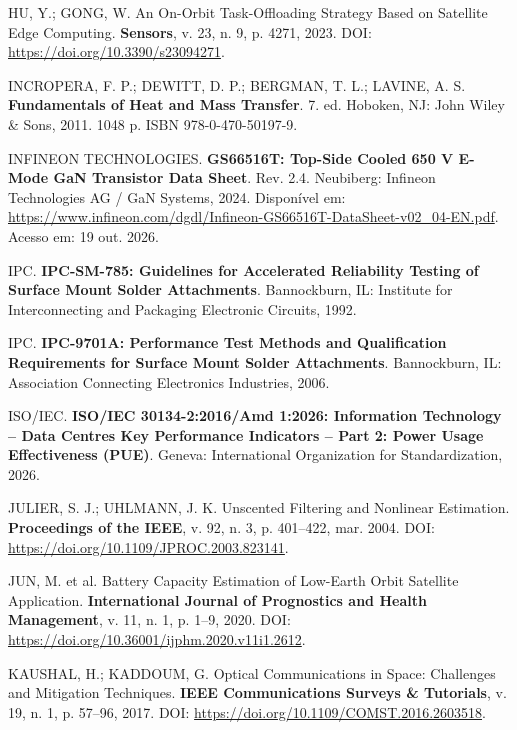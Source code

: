 \vspace{0.2cm}
\noindent HU, Y.; GONG, W. An On-Orbit Task-Offloading Strategy Based on Satellite Edge Computing. \textbf{Sensors}, v. 23, n. 9, p. 4271, 2023. DOI: \url{https://doi.org/10.3390/s23094271}.

\vspace{0.2cm}
\noindent INCROPERA, F. P.; DEWITT, D. P.; BERGMAN, T. L.; LAVINE, A. S. \textbf{Fundamentals of Heat and Mass Transfer}. 7. ed. Hoboken, NJ: John Wiley \& Sons, 2011. 1048 p. ISBN 978-0-470-50197-9.

\vspace{0.2cm}
\noindent INFINEON TECHNOLOGIES. \textbf{GS66516T: Top-Side Cooled 650 V E-Mode GaN Transistor Data Sheet}. Rev. 2.4. Neubiberg: Infineon Technologies AG / GaN Systems, 2024. Disponível em: \url{https://www.infineon.com/dgdl/Infineon-GS66516T-DataSheet-v02_04-EN.pdf}. Acesso em: 19 out. 2026.

\vspace{0.2cm}
\noindent IPC. \textbf{IPC-SM-785: Guidelines for Accelerated Reliability Testing of Surface Mount Solder Attachments}. Bannockburn, IL: Institute for Interconnecting and Packaging Electronic Circuits, 1992.

\vspace{0.2cm}
\noindent IPC. \textbf{IPC-9701A: Performance Test Methods and Qualification Requirements for Surface Mount Solder Attachments}. Bannockburn, IL: Association Connecting Electronics Industries, 2006.

\vspace{0.2cm}
\noindent ISO/IEC. \textbf{ISO/IEC 30134-2:2016/Amd 1:2026: Information Technology -- Data Centres Key Performance Indicators -- Part 2: Power Usage Effectiveness (PUE)}. Geneva: International Organization for Standardization, 2026.

\vspace{0.2cm}
\noindent JULIER, S. J.; UHLMANN, J. K. Unscented Filtering and Nonlinear Estimation. \textbf{Proceedings of the IEEE}, v. 92, n. 3, p. 401--422, mar. 2004. DOI: \url{https://doi.org/10.1109/JPROC.2003.823141}.

\vspace{0.2cm}
\noindent JUN, M. et al. Battery Capacity Estimation of Low-Earth Orbit Satellite Application. \textbf{International Journal of Prognostics and Health Management}, v. 11, n. 1, p. 1--9, 2020. DOI: \url{https://doi.org/10.36001/ijphm.2020.v11i1.2612}.

\vspace{0.2cm}
\noindent KAUSHAL, H.; KADDOUM, G. Optical Communications in Space: Challenges and Mitigation Techniques. \textbf{IEEE Communications Surveys \& Tutorials}, v. 19, n. 1, p. 57--96, 2017. DOI: \url{https://doi.org/10.1109/COMST.2016.2603518}.

